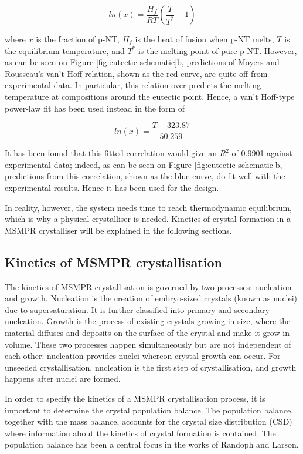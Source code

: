 \begin{equation}
    ln(x) = \frac{H_f}{R T}(\frac{T}{T^*} - 1)
\end{equation}

\noindent where $x$ is the fraction of p-NT, $H_f$ is the heat of fusion when p-NT melts, $T$ is the equilibrium temperature, and $T^*$ is the melting point of pure p-NT. However, as can be seen on Figure \ref{fig:eutectic schematic}b, predictions of Moyers and Rousseau's van't Hoff relation, shown as the red curve, are quite off from experimental data. In particular, this relation over-predicts the melting temperature at compositions around the eutectic point. Hence, a van't Hoff-type power-law fit has been used instead in the form of 

\begin{equation}
     ln(x) = \frac{T - 323.87}{50.259}
\end{equation}

\noindent It has been found that this fitted correlation would give an $R^2$ of 0.9901 against experimental data; indeed, as can be seen on Figure \ref{fig:eutectic schematic}b, predictions from this correlation, shown as the blue curve, do fit well with the experimental results. Hence it has been used for the design.

In reality, however, the system needs time to reach thermodynamic equilibrium, which is why a physical crystalliser is needed. Kinetics of crystal formation in a MSMPR crystalliser will be explained in the following sections.

\subsection{Kinetics of MSMPR crystallisation}
The kinetics of MSMPR crystallisation is governed by two processes: nucleation and growth. Nucleation is the creation of embryo-sized crystals (known as nuclei) due to supersaturation. \cite{richardson} It is further classified into primary and secondary nucleation. Growth is the process of existing crystals growing in size, where the material diffuses and deposits on the surface of the crystal and make it grow in volume. These two processes happen simultaneously but are not independent of each other: nucleation provides nuclei whereon crystal growth can occur. For unseeded crystallisation, nucleation is the first step of crystallisation, and growth happens after nuclei are formed. 

In order to specify the kinetics of a MSMPR crystallisation process, it is important to determine the crystal population balance. The population balance, together with the mass balance, accounts for the crystal size distribution (CSD) where information about the kinetics of crystal formation is contained. The population balance has been a central focus in the works of Randoph and Larson. \cite{randolph larson}

